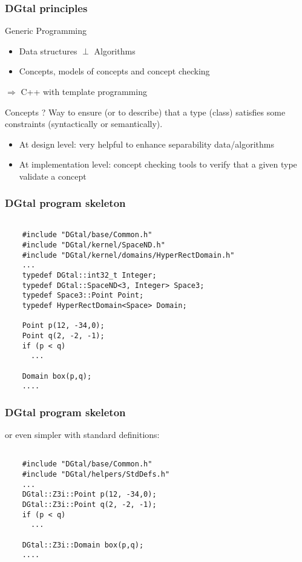 \documentclass[8pt]{beamer}
\begin{document}
\begin{frame}
  \frametitle{DGtal principles}
\small
  \begin{block}{Generic Programming}
    \begin{itemize}
    \item Data structures $\perp$ Algorithms  
    \item Concepts, models of concepts and concept checking
    \end{itemize}
  \end{block}

\vspace{0.6cm}
\alert{$\Rightarrow$ C++  with template programming }
\small

\begin{exampleblock}{Concepts ?}
  Way to ensure (or to describe) that a type (class) satisfies some
  constraints (syntactically or semantically).
  \begin{itemize}
  \item At design level: very helpful to enhance separability
    data/algorithms
  \item At implementation level: concept checking tools to verify that
    a given type validate a concept
  \end{itemize}
\end{exampleblock}
\end{frame}

\begin{frame}[containsverbatim]
\frametitle{DGtal program skeleton}

  \begin{lstlisting}
    
    #include "DGtal/base/Common.h"
    #include "DGtal/kernel/SpaceND.h"
    #include "DGtal/kernel/domains/HyperRectDomain.h"
    ...
    typedef DGtal::int32_t Integer;
    typedef DGtal::SpaceND<3, Integer> Space3;
    typedef Space3::Point Point;
    typedef HyperRectDomain<Space> Domain;
    
    Point p(12, -34,0);
    Point q(2, -2, -1);
    if (p < q)
      ...
    
    Domain box(p,q);
    ....

  \end{lstlisting}
\end{frame}


\begin{frame}[containsverbatim]
\frametitle{DGtal program skeleton}

or even simpler with standard definitions:

  \begin{lstlisting}
    
    #include "DGtal/base/Common.h"
    #include "DGtal/helpers/StdDefs.h"
    ...
    DGtal::Z3i::Point p(12, -34,0);
    DGtal::Z3i::Point q(2, -2, -1);
    if (p < q)
      ...
    
    DGtal::Z3i::Domain box(p,q);
    ....

  \end{lstlisting}
\end{frame}
\end{document}
